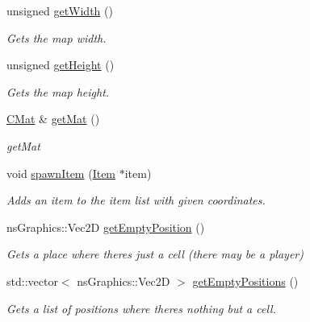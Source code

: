 \begin{DoxyCompactItemize}
unsigned \hyperlink{classns_game_1_1_map_a948d05a71e53131418c9cf19c2da1062}{get\+Width} ()
\begin{DoxyCompactList}\small\item\em Gets the map width. \end{DoxyCompactList}\item 
unsigned \hyperlink{classns_game_1_1_map_a8ae7e6fe93f1318c0d7d2569e73ec144}{get\+Height} ()
\begin{DoxyCompactList}\small\item\em Gets the map height. \end{DoxyCompactList}\item 
\hyperlink{type_8h_a64a592133575ccebb1b36453acbec02b}{C\+Mat} \& \hyperlink{classns_game_1_1_map_a2cbbebf0522026dff6cfbb0236fe5150}{get\+Mat} ()
\begin{DoxyCompactList}\small\item\em get\+Mat \end{DoxyCompactList}\item 
void \hyperlink{classns_game_1_1_map_a7197e3e471d8a827ad195e74707f4052}{spawn\+Item} (\hyperlink{structns_game_1_1_item}{Item} $\ast$item)
\begin{DoxyCompactList}\small\item\em Adds an item to the item list with given coordinates. \end{DoxyCompactList}\item 
ns\+Graphics\+::\+Vec2D \hyperlink{classns_game_1_1_map_a9c7ae85f01db94d0bedbce4aee4d52f0}{get\+Empty\+Position} ()
\begin{DoxyCompactList}\small\item\em Gets a place where there\textquotesingle{}s just a cell (there may be a player) \end{DoxyCompactList}\item 
std\+::vector$<$ ns\+Graphics\+::\+Vec2D $>$ \hyperlink{classns_game_1_1_map_a098dda0872f84fa83c61693efaca48f1}{get\+Empty\+Positions} ()
\begin{DoxyCompactList}\small\item\em Gets a list of positions where there\textquotesingle{}s nothing but a cell. \end{DoxyCompactList}\end{DoxyCompactItemize}
